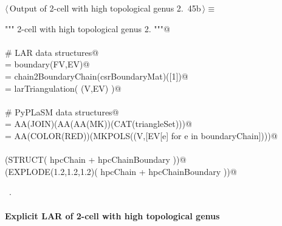 \documentclass[11pt,oneside]{article}    %
\begin{document}
\begin{flushleft} \small \label{scrap76}
\protect{}$\langle\,$Output of 2-cell with high topological genus 2.\nobreak\ {\footnotesize 45b}$\,\rangle\equiv$
\vspace{-1ex}
\begin{list}{}{} \item
\mbox{}\verb@""" 2-cell with high topological genus 2. """@\\
\mbox{}\verb@@\\
\mbox{}\verb@# LAR data structures@\\
\mbox{}\verb@csrBoundaryMat = boundary(FV,EV)@\\
\mbox{}\verb@boundaryChain = chain2BoundaryChain(csrBoundaryMat)([1])@\\
\mbox{}\verb@triangleSet = larTriangulation( (V,EV) )@\\
\mbox{}\verb@@\\
\mbox{}\verb@# PyPLaSM data structures@\\
\mbox{}\verb@hpcChain = AA(JOIN)(AA(AA(MK))(CAT(triangleSet)))@\\
\mbox{}\verb@hpcChainBoundary = AA(COLOR(RED))(MKPOLS((V,[EV[e] for e in boundaryChain])))@\\
\mbox{}\verb@@\\
\mbox{}\verb@VIEW(STRUCT( hpcChain + hpcChainBoundary ))@\\
\mbox{}\verb@VIEW(EXPLODE(1.2,1.2,1.2)( hpcChain + hpcChainBoundary ))@\\
\mbox{}\verb@@{\NWsep}
\end{list}
\vspace{-1ex}
\footnotesize\addtolength{\baselineskip}{-1ex}
\begin{list}{}{\setlength{\itemsep}{-\parsep}\setlength{\itemindent}{-\leftmargin}}
\item \NWtxtMacroRefIn\ .
\end{list}
\end{flushleft}

\paragraph{Explicit LAR of 2-cell with high topological genus}
\end{document}
